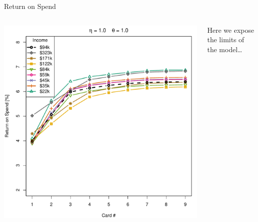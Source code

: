 \begin{frame}{Return on Spend}
    \begin{columns}[c]
        \begin{column}{0.7\textwidth}
            \includegraphics[width=0.9\textheight]{../Figures/ROSvsKvsIncome_1_1.pdf}
        \end{column}
        \begin{column}{0.3\textwidth}
            \centering
            Here we expose the limits of the model\ldots
        \end{column}
    \end{columns}
\end{frame} 

